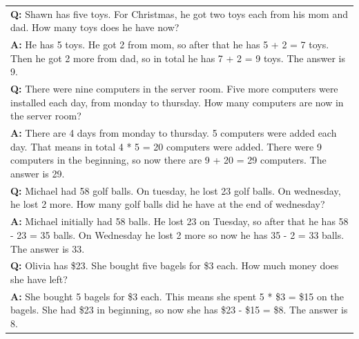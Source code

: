\begin{table}
\begin{tabular}{p{13.5cm}}
        \vspace{0mm}
        \textbf{Q:} Shawn has five toys. For Christmas, he got two toys each from his mom and dad. How many toys does he have now? \\
        \vspace{-1mm}
        \textbf{A:} He has 5 toys. He got 2 from mom, so after that he has 5 + 2 = 7 toys. Then he got 2 more from dad, so in total he has 7 + 2 = 9 toys. The answer is 9. \\
        \vspace{0mm}
        \textbf{Q:} There were nine computers in the server room. Five more computers were installed each day, from monday to thursday. How many computers are now in the server room? \\
        \vspace{-1mm}
        \textbf{A:} There are 4 days from monday to thursday. 5 computers were added each day. That means in total 4 * 5 = 20 computers were added. There were 9 computers in the beginning, so now there are 9 + 20 = 29 computers. The answer is 29. \\
        \vspace{0mm}
        \textbf{Q:} Michael had 58 golf balls. On tuesday, he lost 23 golf balls. On wednesday, he lost 2 more. How many golf balls did he have at the end of wednesday? \\
        \vspace{-1mm}
        \textbf{A:} Michael initially had 58 balls. He lost 23 on Tuesday, so after that he has 58 - 23 = 35 balls. On Wednesday he lost 2 more so now he has 35 - 2 = 33 balls. The answer is 33.\ \\
        \vspace{0mm}
        \textbf{Q:} Olivia has \$23. She bought five bagels for \$3 each. How much money does she have left? \\
        \vspace{-1mm}
        \textbf{A:} She bought 5 bagels for \$3 each. This means she spent 5 * \$3 = \$15 on the bagels. She had \$23 in beginning, so now she has \$23 - \$15 = \$8. The answer is 8. \\
        \bottomrule
    \end{tabular}
    \label{tab:prompt-math}
    \vspace{-0.1in}
\end{table}

